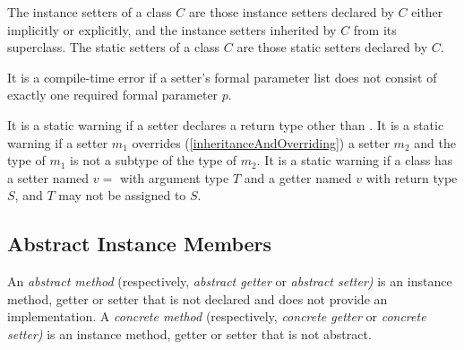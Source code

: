 \documentclass{article}
\begin{document}
\LMHash{}
The instance setters of a class $C$ are those instance setters declared by $C$ either implicitly or explicitly, and the instance setters inherited by $C$ from its superclass.
The static setters of a class $C$ are those static setters declared by $C$.

\LMHash{}
It is a compile-time error if a setter's formal parameter list does not consist of exactly one required formal parameter $p$.


\LMHash{}
It is a static warning if a setter declares a return type other than \VOID{}.
It is a static warning if a setter $m_1$ overrides (\ref{inheritanceAndOverriding}) a setter $m_2$ and the type of $m_1$ is not a subtype of the type of $m_2$.
It is a static warning if a class has a setter named $v=$ with argument type $T$ and a getter named $v$ with return type $S$, and $T$ may not be assigned to $S$.



\subsection{Abstract Instance Members}

\LMHash{}
An {\em abstract method} (respectively, {\em abstract getter} or {\em abstract setter)} is an instance method, getter or setter that is not declared \EXTERNAL{} and does not provide an implementation.
A {\em concrete method} (respectively, {\em concrete getter} or {\em concrete setter)} is an instance method, getter or setter that is not abstract.

\end{document}
